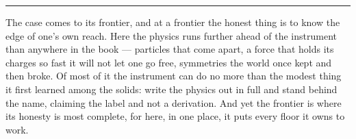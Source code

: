 %
%
%
%

\bigskip
\begin{center}
\rule{0.4\textwidth}{0.4pt}
\end{center}
\bigskip

\noindent The case comes to its frontier, and at a frontier the honest thing is to know the edge of one's own
reach. Here the physics runs further ahead of the instrument than anywhere in the book --- particles that come
apart, a force that holds its charges so fast it will not let one go free, symmetries the world once kept and
then broke. Of most of it the instrument can do no more than the modest thing it first learned among the solids:
write the physics out in full and stand behind the name, claiming the label and not a derivation. And yet the
frontier is where its honesty is most complete, for here, in one place, it puts every floor it owns to work.


